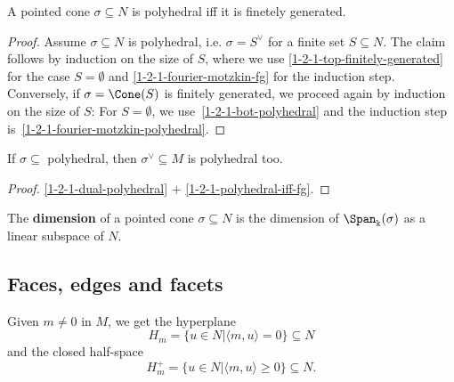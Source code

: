 \begin{proposition}[Polyhedral = Finitely generated]
  \label{1-2-1-polyhedral-iff-fg}
  \uses{}
  A pointed cone \( \sigma \subseteq N \) is polyhedral iff it is
  finetely generated.
\end{proposition}
\begin{proof}
  Assume \( \sigma \subseteq N \) is polyhedral, i.e. \( \sigma =
  S^\vee \) for a finite set \( S \subseteq N \). The claim follows by
  induction on the size of \( S \), where we use
  \ref{1-2-1-top-finitely-generated} for the case \( S = \emptyset \)
  and \ref{1-2-1-fourier-motzkin-fg} for the induction step.
  Conversely, if \( \sigma = \Cone(S) \) is finitely generated, we
  proceed again by induction on the size of \( S \): For \( S =
  \emptyset \), we use~\ref{1-2-1-bot-polyhedral} and the induction
  step is~\ref{1-2-1-fourier-motzkin-polyhedral}.
\end{proof}


\begin{proposition}
  \label{1-2-2-dual-polyhedral-cone}
  If \( \sigma \subseteq \)
  polyhedral, then \( \sigma^\vee \subseteq M \) is polyhedral too.
\end{proposition}
\begin{proof}
  \leanok
  \ref{1-2-1-dual-polyhedral} \( + \) \ref{1-2-1-polyhedral-iff-fg}.
\end{proof}



\begin{definition}
  \label{1-2-1-cone-dimension}
  \uses{}
  The {\bf dimension} of a pointed cone \( \sigma \subseteq N \) is
  the dimension of \( \Span_{\Bbbk}(\sigma) \) as a linear subspace of
  \( N \).
\end{definition}


\subsection{Faces, edges and facets}



Given $m \ne 0$ in $M$, we get the hyperplane
$$H_m = \{u \in N | \langle m, u\rangle = 0\} \subseteq N$$
and the closed half-space
$$H_m^+ = \{u \in N | \langle m, u\rangle \ge 0\} \subseteq N.$$


